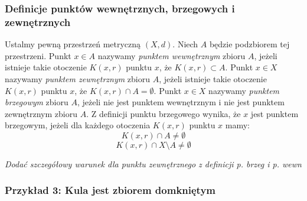 \documentclass{article}
\begin{document}
\subsubsection{Definicje punktów wewnętrznych, brzegowych i zewnętrznych}
Ustalmy pewną przestrzeń metryczną \((X, d)\). Niech \(A\) będzie podzbiorem tej przestrzeni. Punkt \(x \in A\) nazywamy \emph{punktem wewnętrznym}
zbioru \(A\), jeżeli istnieje takie otoczenie \(K(x, r)\) punktu \(x\), że \(K(x,r) \subset A\). Punkt \(x \in X\) nazywamy
\emph{punktem zewnętrznym} zbioru \(A\), jeżeli istnieje takie otoczenie \(K(x, r)\) punktu \(x\),
że \(K(x, r) \cap A = \emptyset\). Punkt \(x \in X\) nazywamy \emph{punktem brzegowym} zbioru \(A\), jeżeli nie jest punktem
wewnętrznym i nie jest punktem zewnętrznym zbioru \(A\). Z definicji punktu brzegowego wynika, że \(x\) jest punktem
brzegowym, jeżeli dla każdego otoczenia \(K(x, r)\) punktu \(x\) mamy:
\begin{equation*}
    K(x, r) \cap A \neq \emptyset
\end{equation*}
\begin{equation*}
    K(x, r) \cap X \setminus A \neq \emptyset
\end{equation*}
\begin{center}
    \emph{Dodać szczegółowy warunek dla punktu zewnętrznego z definicji p. brzeg i p. wewn}
\end{center}
\newpage
\subsubsection{Przykład 3: Kula jest zbiorem domkniętym}
\end{document}

